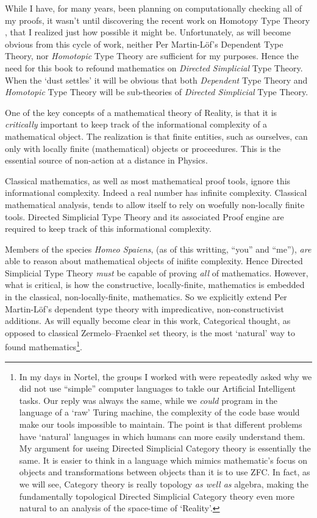 \documentclass[a4paper,openany]{amsbook}
\begin{document}
While I have, for many years, been planning on computationally checking all of
my proofs, it wasn't until discovering the recent work on Homotopy Type Theory
\cite{HoTT}, that I realized just how possible it might be. Unfortunately, as
will become obvious from this cycle of work, neither Per Martin-L\"of's
Dependent Type Theory, nor \emph{Homotopic} Type Theory are sufficient for my
purposes. Hence the need for this book to refound mathematics on \emph{Directed
Simplicial} Type Theory.  When the `dust settles' it will be obvious that both
\emph{Dependent} Type Theory and \emph{Homotopic} Type Theory will be
sub-theories of \emph{Directed Simplicial} Type Theory.

One of the key concepts of a mathematical theory of Reality, is that it is
\emph{critically} important to keep track of the informational complexity of a
mathematical object. The realization is that finite entities, such as ourselves,
can only  with locally finite (mathematical) objects or
proceedures. This is the essential source of non-action at a distance in
Physics.

Classical mathematics, as well as most mathematical proof tools, ignore this
informational complexity. Indeed a real number has infinite complexity. 
Classical mathematical analysis, tends to allow itself to rely on woefully
non-locally finite tools. Directed Simplicial Type Theory and its associated
Proof engine are required to keep track of this informational complexity.

Members of the species \textit{Homeo Spaiens}, (as of this writting, ``you'' and
``me''), \emph{are} able to reason about mathematical objects of inifite
complexity.  Hence Directed Simplicial Type Theory \emph{must} be capable of
proving \emph{all} of mathematics. However, what is critical, is how the
constructive, locally-finite, mathematics is embedded in the classical,
non-locally-finite, mathematics. So we explicitly extend Per Martin-L\"of's
dependent type theory with impredicative, non-constructivist additions. As will
equally become clear in this work, Categorical thought, as opposed to classical
Zermelo–Fraenkel set theory, is the most `natural' way to found
mathematics\footnote{In my days in Nortel, the groups I worked with were
repeatedly asked why we did not use ``simple'' computer languages to takle our
Artificial Intelligent tasks. Our reply was always the same, while we
\emph{could} program in the language of a `raw' Turing machine, the complexity
of the code base would make our tools impossible to maintain. The point is that
different problems have `natural' languages in which humans can more easily
understand them. My argument for useing Directed Simplicial Category theory is
essentially the same. It is easier to think in a language which mimics
mathematic's focus on objects and transformations between objects than it is to
use ZFC. In fact, as we will see, Category theory is really topology \emph{as
well as} algebra, making the fundamentally topological Directed Simplicial
Category theory even more natural to an analysis of the space-time of
`Reality'.}.
\end{document}
